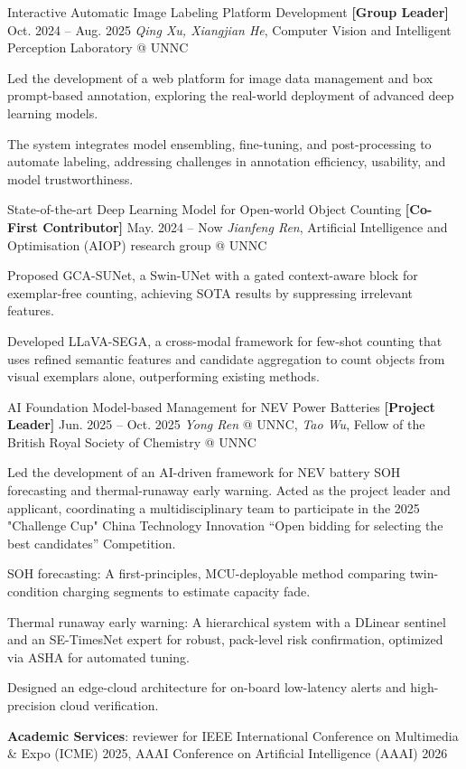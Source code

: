     \item[\raisebox{0.3ex}{\textbullet}]
    \cvResearchEntry
      {Interactive Automatic Image Labeling Platform Development}
      {\textbf{[Group Leader]} Oct. 2024 -- Aug. 2025}
      {\textit{Qing Xu, Xiangjian He}, Computer Vision and Intelligent Perception Laboratory @ UNNC}
      {
      Led the development of a web platform for image data management and box prompt-based annotation, exploring the real-world deployment of advanced deep learning models. \\
      \item The system integrates model ensembling, fine-tuning, and post-processing to automate labeling, addressing challenges in annotation efficiency, usability, and model trustworthiness.
    }



    
    \item[\raisebox{0.3ex}{\textbullet}]
    \cvResearchEntry
      {State-of-the-art Deep Learning Model for Open-world Object Counting}
      {\textbf{[Co-First Contributor]} May. 2024 -- Now}
      {\textit{Jianfeng Ren}, Artificial Intelligence and Optimisation (AIOP) research group @ UNNC}
      {
        Proposed GCA-SUNet, a Swin-UNet with a gated context-aware block for exemplar-free counting, achieving SOTA results by suppressing irrelevant features. \\
        \item Developed LLaVA-SEGA, a cross-modal framework for few-shot counting that uses refined semantic features and candidate aggregation to count objects from visual exemplars alone, outperforming existing methods.
    }


    \item[\raisebox{0.3ex}{\textbullet}]
    \cvResearchEntry
      {AI Foundation Model-based Management for NEV Power Batteries}
      {\textbf{[Project Leader]} Jun. 2025 -- Oct. 2025}
      {\textit{Yong Ren} @ UNNC, \textit{Tao Wu}, Fellow of the British Royal Society of Chemistry @ UNNC}
      {
        Led the development of an AI-driven framework for NEV battery SOH forecasting and thermal-runaway early warning. Acted as the project leader and applicant, coordinating a multidisciplinary team to participate in the 2025 "Challenge Cup" China Technology Innovation “Open bidding for selecting the best candidates” Competition. \\
        \item SOH forecasting: A first-principles, MCU-deployable method comparing twin-condition charging segments to estimate capacity fade.
        \item Thermal runaway early warning: A hierarchical system with a DLinear sentinel and an SE-TimesNet expert for robust, pack-level risk confirmation, optimized via ASHA for automated tuning.
        \item Designed an edge-cloud architecture for on-board low-latency alerts and high-precision cloud verification.
      }


\item[\raisebox{0.3ex}{\textbullet}] \textbf{Academic Services}: reviewer for IEEE International Conference on Multimedia \& Expo (ICME) 2025, AAAI Conference on Artificial Intelligence (AAAI) 2026


\cvResearchListEnd%